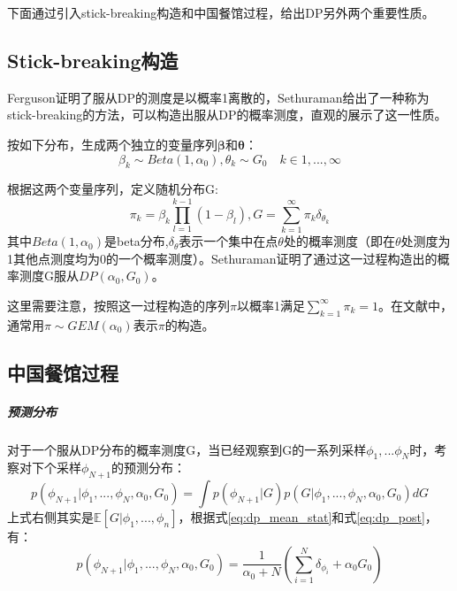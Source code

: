 下面通过引入stick-breaking构造和中国餐馆过程，给出DP另外两个重要性质。

\subsection{Stick-breaking构造}

Ferguson证明了服从DP的测度是以概率1离散的\cite{Fer:73}，Sethuraman给出了一种称为stick-breaking的方法，可以构造出服从DP的概率测度，直观的展示了这一性质。

按如下分布，生成两个独立的变量序列${\bm \beta}$和${\bm \theta}$：
\begin{equation}
\beta_k \sim Beta(1,\alpha_0), \theta_k \sim G_0 \quad k \in 1,...,\infty
\end{equation}

根据这两个变量序列，定义随机分布G:
\begin{equation}
\pi_k = \beta_k\prod_{l=1}^{k-1}(1 - \beta_l), G = \sum_{k=1}^{\infty}\pi_k\delta_{\theta_k}
\end{equation}
其中$Beta(1,\alpha_0)$是beta分布,$\delta_{\theta}$表示一个集中在点$\theta$处的概率测度（即在$\theta$处测度为1其他点测度均为0的一个概率测度）。Sethuraman证明了通过这一过程构造出的概率测度G服从$DP(\alpha_0,G_0)$。

这里需要注意，按照这一过程构造的序列$\pi$以概率1满足$\sum_{k=1}^{\infty}\pi_k = 1$。在文献中，通常用$\pi \sim GEM(\alpha_0)$表示$\pi$的构造。

\subsection{中国餐馆过程}
\subparagraph{预测分布}
对于一个服从DP分布的概率测度G，当已经观察到G的一系列采样$\phi_1,...\phi_N$时，考察对下个采样$\phi_{N+1}$的预测分布：
\begin{equation}
p(\phi_{N+1}|\phi_1,...,\phi_N,\alpha_0,G_0) = \int{p(\phi_{N+1}|G)p(G|\phi_1,...,\phi_N,\alpha_0,G_0)}dG
\end{equation}
上式右侧其实是$\mathbb{E}[G|\phi_1,...,\phi_n]$，根据式\eqref{eq:dp_mean_stat}和式\eqref{eq:dp_post}，有：
\begin{equation}
p(\phi_{N+1}|\phi_1,...,\phi_N,\alpha_0,G_0) = \frac{1}{\alpha_0+N}(\sum_{i=1}^N\delta_{\phi_i} +\alpha_0G_0)\label{eq:polya_urn}
\end{equation}

